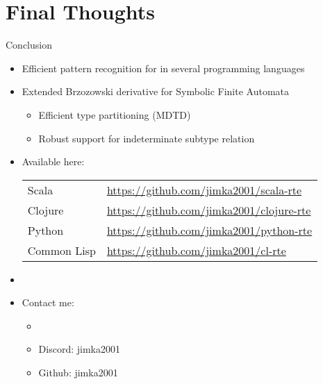 \section{Final Thoughts}


{
\begin{frame}{Conclusion}
  \begin{itemize}
  \item Efficient pattern recognition for  in several programming languages
  \item Extended Brzozowski derivative for Symbolic Finite Automata
    \begin{itemize}
    \item Efficient type partitioning (MDTD)
    \item Robust support for indeterminate subtype relation
    \end{itemize}
  \item Available here:
    \begin{tabular}{ll}
    Scala & \url{https://github.com/jimka2001/scala-rte}\\
    Clojure & \url{https://github.com/jimka2001/clojure-rte}\\
    Python & \url{https://github.com/jimka2001/python-rte}\\
    Common Lisp & \url{https://github.com/jimka2001/cl-rte}    
  \end{tabular}
  \item {}

    \bigskip

  \item Contact me: 
    \begin{itemize}
    \item {}
    \item Discord: jimka2001
    \item Github: jimka2001
      
    \end{itemize}
  \end{itemize}
\end{frame}

}
